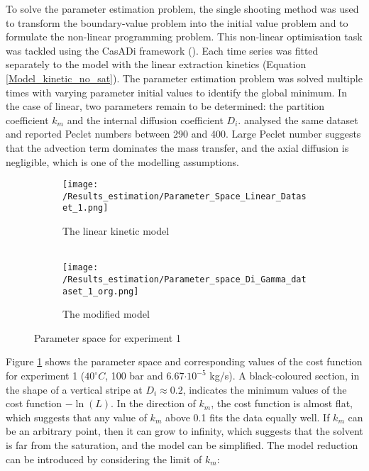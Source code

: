 \documentclass[../Supercritical_fluid_extraction_of_essential_oil_from_chamomile.tex]{subfiles}
\begin{document}
	
	\label{CH: Results}
		
	To solve the parameter estimation problem, the single shooting method was used to transform the boundary-value problem into the initial value problem and to formulate the non-linear programming problem. This non-linear optimisation task was tackled using the CasADi framework (\citet{Andersson2018}). Each time series was fitted separately to the model with the linear extraction kinetics (Equation \ref{Model_kinetic_no_sat}). The parameter estimation problem was solved multiple times with varying parameter initial values to identify the global minimum. In the case of linear, two parameters remain to be determined: the partition coefficient $k_m$ and the internal diffusion coefficient $D_i$. \citet{Rahimi2011} analysed the same dataset and reported Peclet numbers between 290 and 400. Large Peclet number suggests that the advection term dominates the mass transfer, and the axial diffusion is negligible, which is one of the modelling assumptions.
		
	\begin{figure}[!h]
		\centering
		\begin{subfigure}{0.9\columnwidth}
			\centering
			\texttt{[image: /Results\_estimation/Parameter\_Space\_Linear\_Dataset\_1.png]}
			\caption{The linear kinetic model \\ ~}
			\label{fig: Fit_1_linear}
		\end{subfigure}
		\hfill
		\begin{subfigure}{0.9\columnwidth}
			\centering
			\texttt{[image: /Results\_estimation/Parameter\_space\_Di\_Gamma\_dataset\_1\_org.png]}
			\caption{The modified model}
			\label{fig: Fit_1_Di_Gamma}
		\end{subfigure}
		\caption{Parameter space for experiment 1}
	\end{figure}
	
	Figure \ref{fig: Fit_1_linear} shows the parameter space and corresponding values of the cost function for experiment 1 ($40^\circ C$, 100 bar and 6.67$\cdot 10^{-5}$ kg/s). A black-coloured section, in the shape of a vertical stripe at $D_i \approx 0.2$, indicates the minimum values of the cost function $-\ln(L)$. In the direction of $k_m$, the cost function is almost flat, which suggests that any value of $k_m$ above 0.1 fits the data equally well. If $k_m$ can be an arbitrary point, then it can grow to infinity, which suggests that the solvent is far from the saturation, and the model can be simplified. The model reduction can be introduced by considering the limit of $k_m$:
		
\end{document}
